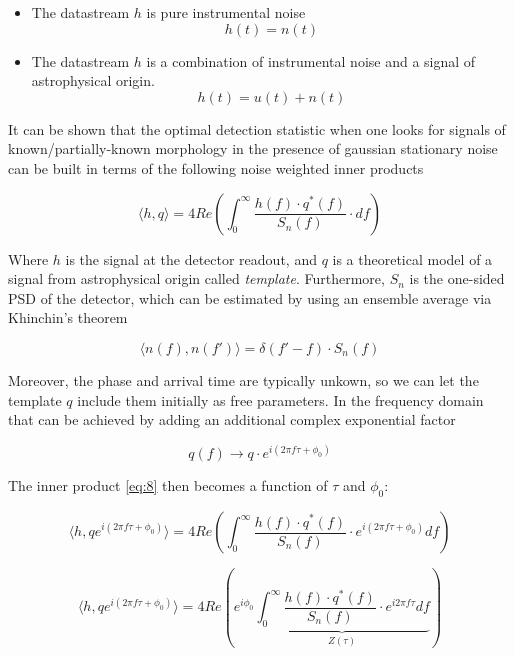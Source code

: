 \begin{itemize}
\item The datastream $h$ is pure instrumental noise
$$ h(t) = n(t)$$
\item The datastream $h$ is a combination of instrumental noise and a signal of astrophysical origin.
$$ h(t) = u(t) + n(t)$$
\end{itemize}


It can be shown that the optimal detection statistic when one looks for signals of known/partially-known morphology in the presence of gaussian stationary noise can be built in terms of the following noise weighted inner products

\begin{equation}\label{eq:8}
\langle h,q \rangle =4 Re\left( \int_{0}^{\infty} \frac{h(f) \cdot q^{*}(f)}{S_n(f)} \cdot df \right)
\end{equation}

Where $h$ is the signal at the detector readout, and $q$ is a theoretical model of a signal from astrophysical origin called \textit{template}. Furthermore, $S_n$ is the one-sided PSD of the detector,  which can be estimated by using an ensemble average via Khinchin's theorem

\begin{equation}\label{PSD}
\langle n(f), n(f') \rangle = \delta(f'-f) \cdot S_n(f)
\end{equation}


Moreover, the phase and arrival time are typically unkown, so we can let the template $q$  include them initially as free parameters. In the frequency domain that can be achieved by adding an additional complex exponential factor 


\begin{equation}
q(f)\rightarrow q\cdot e^{i(2\pi f \tau + \phi_0)}
\end{equation}

The inner product \ref{eq:8} then becomes a function of $\tau$ and $\phi_0$:

\begin{equation}\label{eq:9}
\langle h,q e^{i(2\pi f \tau + \phi_0)} \rangle =4 Re\left( \int_{0}^{\infty} \frac{h(f) \cdot q^{*}(f) }{S_n(f)} \cdot e^{i(2\pi f \tau + \phi_0)} df \right)
\end{equation}

\begin{equation}\label{eq:10}
\langle h,q e^{i(2\pi f \tau + \phi_0)} \rangle =4 Re\left( e^{i \phi_0}\underbrace{\int_{0}^{\infty} \frac{h(f) \cdot q^{*}(f) }{S_n(f)} \cdot e^{i 2\pi f \tau} df}_{Z(\tau)} \right)
\end{equation}


